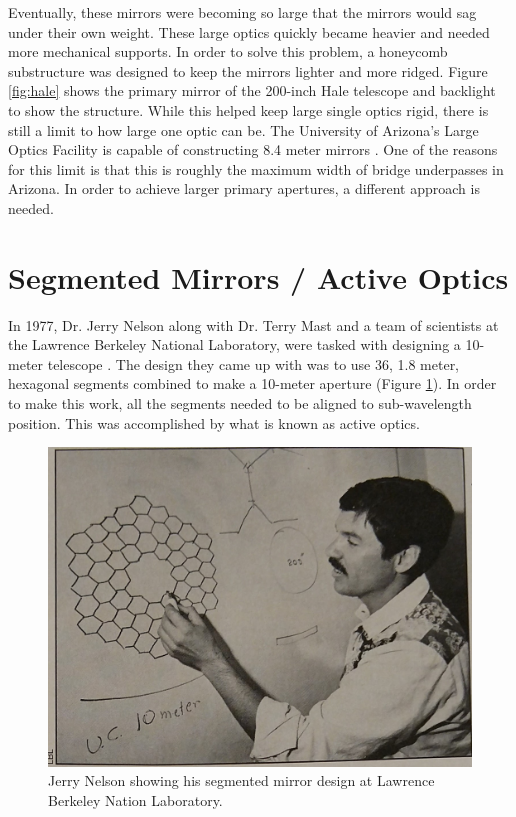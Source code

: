 Eventually, these mirrors were becoming so
large that the mirrors would sag under their own weight.  These large optics quickly became heavier and needed
more mechanical supports.  In order to solve this problem, a honeycomb substructure was designed to keep the
mirrors lighter and more ridged.  Figure \ref{fig:hale} shows the primary mirror of the 200-inch Hale telescope
and backlight to show the structure.  While this helped keep large single optics rigid, there is still a limit
to how large one optic can be.  The University of Arizona's Large Optics Facility is capable of constructing
8.4 meter mirrors \cite{LOFTSystems.}.  One of the reasons for this limit is that this is roughly the maximum
width of bridge underpasses in Arizona.  In order to achieve larger primary apertures, a different approach is
needed.




\section{Segmented Mirrors / Active Optics}

In 1977, Dr. Jerry Nelson along with Dr. Terry Mast and a team of scientists at the Lawrence Berkeley National Laboratory, were tasked with designing a 10-meter telescope \cite{BeatingObservatory}.  The design they came up with was to use 36, 1.8 meter, hexagonal segments combined to make a 10-meter aperture (Figure \ref{fig:jerry_nelson}).  In order to make this work, all the segments needed to be aligned to sub-wavelength position.  This was accomplished by what is known as active optics.

\begin{figure}[H]
\centering
\includegraphics[width=12 cm]{../Figures/Jerry Nelson}
\caption{Jerry Nelson showing his segmented mirror design at Lawrence Berkeley Nation Laboratory.}
\label{fig:jerry_nelson}
\end{figure}

